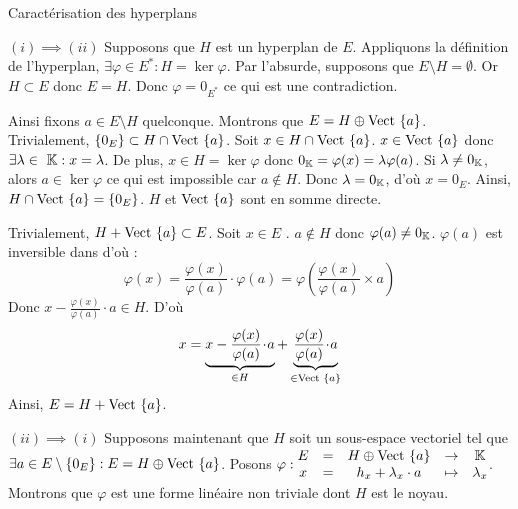 \documentclass{article}
\renewenvironment{question_kholle}[2][ ]
{
	\subsection{\texorpdfstring{#2}{}}
	\notblank{#1}
	{
		\noindent #1
		\bigbreak
	}
	{}
	\begin{proof}
}
{
	\end{proof}
}
\begin{document}
	\begin{question_kholle}
		[Soit $H$ un \sev de $E$.
		Les conditions suivantes sont équivalentes :
		\begin{propositions}
			\item $H$ est un hyperplan de $E$ :
			$\exists \varphi \in E^* : H = \ker \varphi$
			\item $H$ admet une droite vectorielle comme supplémentaire :
			$\exists a \in E \setminus \{0_E\} : H \oplus \Vect{\{a\}} = E$
		\end{propositions}]
		{Caractérisation des hyperplans}
		
		$(i) \implies (ii)$ Supposons que $H$ est un hyperplan de $E$.
		Appliquons la définition de l'hyperplan, $\exists \varphi \in E^* : H = \ker \varphi$.
		Par l'absurde, supposons que $E \setminus H = \emptyset$. Or $H \subset E$ donc $E = H$. Donc $\varphi = 0_{E^*}$ ce qui est une contradiction.

		Ainsi fixons $a \in E \setminus H$ quelconque.
		Montrons que $E = H \oplus \text{Vect }{\{a\}}$.
		Trivialement, $\{0_E\} \subset H \cap \text{Vect }{\{a\}}$.
		Soit $x \in H \cap \text{Vect }{\{a\}}$.
		$x \in \text{Vect }{\{a\}}$ donc $\exists \lambda \in  \K : x = \lambda$. De plus, $x \in H = \ker \varphi$ donc $0_{\mathbb K} = \varphi(x) = \lambda \varphi(a)$.
		Si $\lambda \neq 0_{\mathbb K}$, alors $a \in \ker \varphi$ ce qui est impossible car $a \notin H$.
		Donc $\lambda = 0_{\mathbb K}$, d'où $x = 0_E$.
		Ainsi, $H \cap \text{Vect }{\{a\}} = \{0_E\}$. $H$ et $\text{Vect }{\{a\}}$ sont en somme directe.
		
		Trivialement, $H + \text{Vect }{\{a\}} \subset E$.
		Soit $x \in E$ \fq.
		$a \notin H$ donc $\varphi(a) \neq 0_{\mathbb K}$. $\varphi(a)$ est inversible dans \K d'où :
		\begin{equation*}
			\varphi(x)
			= \frac{\varphi(x)}{\varphi(a)} \cdot \varphi(a)
			= \varphi\left( \frac{\varphi(x)}{\varphi(a)} \times a \right)
		\end{equation*}
		Donc $x - \frac{\varphi(x)}{\varphi(a)} \!\cdot\! a \in H$. D'où
		\begin{equation*}
			x =
			\underbrace{x - \frac{\varphi(x)}{\varphi(a)} \!\cdot\! a}_{\in H}
			+ \underbrace{\frac{\varphi(x)}{\varphi(a)} \!\cdot\! a}_{\in \text{Vect }{\{a\}}}
		\end{equation*}
		Ainsi, $E = H + \text{Vect }{\{a\}}$.
		
		$(ii) \implies (i)$ Supposons maintenant que $H$ soit un sous-espace vectoriel tel que $\exists a \in E \setminus \{0_E\} : E = H \oplus \text{Vect }{\{a\}}$.
		Posons $\displaystyle \varphi : \begin{matrix}
			E &=& H \oplus \text{Vect }{\{a\}} &\rightarrow& \mathbb K \\
			x &=& h_x + \lambda_x \cdot a &\mapsto& \lambda_x
		\end{matrix}$.
		Montrons que $\varphi$ est une forme linéaire non triviale dont $H$ est le noyau.
		\
		

\end{question_kholle}
\end{document}
